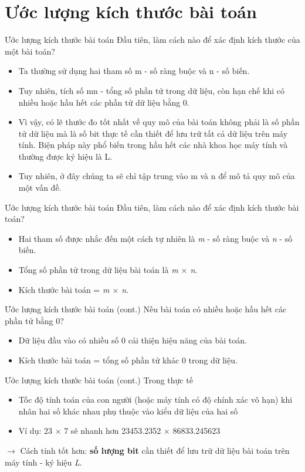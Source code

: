 \documentclass[10pt]{beamer}
\begin{document}
\section{Ước lượng kích thước bài toán}
\begin{frame}{Ước lượng kích thước bài toán}
Đầu tiên, làm cách nào để xác định kích thước của một bài toán?
\begin{itemize}
\item Ta thường sử dụng hai tham số m - số ràng buộc và n - số biến. 
\item Tuy nhiên, tích số mn - tổng số phần tử trong dữ liệu, còn hạn chế khi có nhiều hoặc hầu hết các phần tử dữ liệu bằng 0.
\item Vì vậy, có lẽ thước đo tốt nhất về quy mô của bài toán không phải là số phần tử dữ liệu mà là số bit thực tế cần thiết để lưu trữ tất cả dữ liệu trên máy tính. Biện pháp này phổ biến trong hầu hết các nhà khoa học máy tính và thường được ký hiệu là L.
\item Tuy nhiên, ở đây chúng ta sẽ chỉ tập trung vào m và n để mô tả quy mô của một vấn đề.
\end{itemize}
\end{frame}

\begin{frame}{Ước lượng kích thước bài toán}
Đầu tiên, làm cách nào để xác định kích thước bài toán?\\
\begin{itemize}
\item Hai tham số được nhắc đến một cách tự nhiên là \textit{m} - số ràng buộc và \textit{n} - số biến.
\item Tổng số phần tử trong dữ liệu bài toán là \textit{m $\times$ n}.
\item Kích thước bài toán = \textit{m $\times$ n}.
\end{itemize}
\end{frame}

\begin{frame}{Ước lượng kích thước bài toán (cont.)}
Nếu bài toán có nhiều hoặc hầu hết các phần tử bằng 0?
\begin{itemize}
\item Dữ liệu đầu vào có nhiều số 0 cải thiện hiệu năng của bài toán.
\item Kích thước bài toán = tổng số phần tử khác 0 trong dữ liệu.
\end{itemize}
\end{frame}

\begin{frame}{Ước lượng kích thước bài toán (cont.)}
Trong thực tế
\begin{itemize}
\item Tốc độ tính toán của con người (hoặc máy tính có độ chính xác vô hạn) khi nhân hai số khác nhau phụ thuộc vào kiểu dữ liệu của hai số
\item Ví dụ: 23 $\times$ 7 sẽ nhanh hơn 23453.2352 $\times$ 86833.245623
\end{itemize}
$\rightarrow$ Cách tính tốt hơn: \textbf{số lượng bit} cần thiết để lưu trữ dữ liệu bài toán trên máy tính - ký hiệu \textit{L}.
\end{frame}
\end{document}
